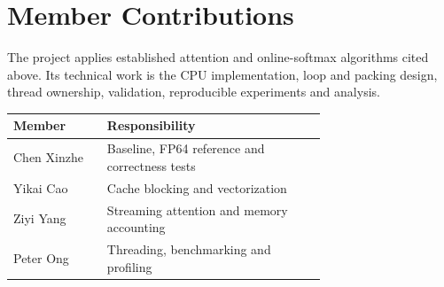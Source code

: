 \documentclass[11pt,a4paper]{article}
\begin{document}
\section{Member Contributions}
The project applies established attention and online-softmax algorithms cited
above. Its technical work is the CPU implementation, loop and packing design,
thread ownership, validation, reproducible experiments and analysis.
\begin{center}
\fontsize{9}{11}\selectfont
\renewcommand{\arraystretch}{1.2}
\begin{tabular}{@{}l >{\raggedright\arraybackslash}p{0.70\linewidth}@{}}
\toprule
Member & Responsibility \\
\midrule
Chen Xinzhe & Baseline, FP64 reference and correctness tests \\
Yikai Cao & Cache blocking and vectorization \\
Ziyi Yang & Streaming attention and memory accounting \\
Peter Ong & Threading, benchmarking and profiling \\
\bottomrule
\end{tabular}
\end{center}
\end{document}
